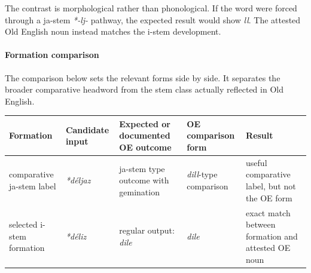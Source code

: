 \documentclass[
  british,
  a4paper,
]{article}
\newcounter{none} %
\begin{document}
The contrast is morphological rather than phonological. If the word were
forced through a ja-stem \emph{*-lj-} pathway, the expected result would
show \emph{ll}. The attested Old English noun instead matches the i-stem
development.

\paragraph{Formation comparison}\label{formation-comparison-1}

The comparison below sets the relevant forms side by side. It separates
the broader comparative headword from the stem class actually reflected
in Old English.

{\def\LTcaptype{none} %
\begin{longtable}[]{@{}
  >{\raggedright\arraybackslash}p{}
  >{\raggedright\arraybackslash}p{}
  >{\raggedright\arraybackslash}p{}
  >{\raggedright\arraybackslash}p{}
  >{\raggedright\arraybackslash}p{}@{}}
\toprule\noalign{}
\begin{minipage}[b]{\linewidth}\raggedright
Formation
\end{minipage} & \begin{minipage}[b]{\linewidth}\raggedright
Candidate input
\end{minipage} & \begin{minipage}[b]{\linewidth}\raggedright
Expected or documented OE outcome
\end{minipage} & \begin{minipage}[b]{\linewidth}\raggedright
OE comparison form
\end{minipage} & \begin{minipage}[b]{\linewidth}\raggedright
Result
\end{minipage} \\
\midrule\noalign{}
\endhead
\bottomrule\noalign{}
\endlastfoot
comparative ja-stem label & {\emph{*déljaz}} & ja-stem type outcome with
gemination & {\emph{dill}}-type comparison & useful comparative label,
but not the OE form \\
selected i-stem formation & {\emph{*déliz}} & regular output:
{\emph{dile}} & {\emph{dile}} & exact match between formation and
attested OE noun \\
\end{longtable}
}
\end{document}
